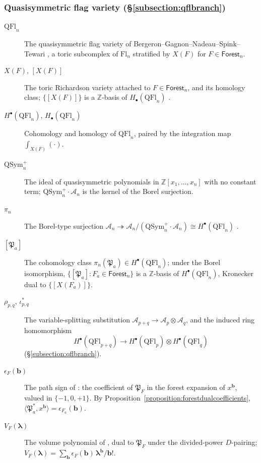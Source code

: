 \documentclass[a4paper,fleqn]{cas-sc}
\theoremstyle{definition}
\theoremstyle{remark}
\numberwithin{equation}{subsection}
\newcommand{\coma}{\mathcal{A}}
\newcommand{\forest}{\mathfrak{P}}
\begin{document}
\subsubsection*{Quasisymmetric flag variety (\S\ref{subsection:qflbranch})}
\begin{description}
\item[$\mathrm{QFl}_n$] The quasisymmetric flag variety of Bergeron--Gagnon--Nadeau--Spink--Tewari \cite{bergeron2025qsymflag}, a toric subcomplex of $\mathrm{Fl}_n$ stratified by $X(F)$ for $F\in\mathsf{Forest}_n$.
\item[{$X(F)$, $[X(F)]$}] The toric Richardson variety attached to $F\in\mathsf{Forest}_n$, and its homology class; $\{[X(F)]\}$ is a $\mathbb{Z}$-basis of $H_\bullet(\mathrm{QFl}_n)$ \cite[Cor.~11.6]{bergeron2025qsymflag}.
\item[$H^\bullet(\mathrm{QFl}_n)$, $H_\bullet(\mathrm{QFl}_n)$] Cohomology and homology of $\mathrm{QFl}_n$, paired by the integration map $\int_{X(F)}(\cdot)$.
\item[$\mathrm{QSym}_n^+$] The ideal of quasisymmetric polynomials in $\mathbb{Z}[x_1,\ldots,x_n]$ with no constant term; $\mathrm{QSym}_n^+\!\cdot\coma_n$ is the kernel of the Borel surjection.
\item[$\pi_n$] The Borel-type surjection $\coma_n\twoheadrightarrow\coma_n/(\mathrm{QSym}_n^+\!\cdot\coma_n)\cong H^\bullet(\mathrm{QFl}_n)$ \cite[Thm.~A and Cor.~12.5]{bergeron2025qsymflag}.
\item[{$[\forest_a]$}] The cohomology class $\pi_n(\forest_a)\in H^\bullet(\mathrm{QFl}_n)$; under the Borel isomorphism, $\{[\forest_a]:F_a\in\mathsf{Forest}_n\}$ is a $\mathbb{Z}$-basis of $H^\bullet(\mathrm{QFl}_n)$, Kronecker dual to $\{[X(F_a)]\}$.
\item[$\rho_{p,q}$, $\iota_{p,q}^*$] The variable-splitting substitution $\coma_{p+q}\to\coma_p\otimes\coma_q$, and the induced ring homomorphism
$$H^\bullet(\mathrm{QFl}_{p+q})\to H^\bullet(\mathrm{QFl}_p)\otimes H^\bullet(\mathrm{QFl}_q)$$
(\S\ref{subsection:qflbranch}).
\item[$\epsilon_F(\mathbf{b})$] The path sign of \cite[Prop.~10.15]{nadeau2024quasisymmetric}: the coefficient of $\forest_F$ in the forest expansion of $x^{\mathbf{b}}$, valued in $\{-1,0,+1\}$. By Proposition~\ref{proposition:forestdualcoefficients}, $\langle\forest_a^*,x^{\mathbf{b}}\rangle=\epsilon_{F_a}(\mathbf{b})$.
\item[$V_F(\boldsymbol\lambda)$] The volume polynomial of \cite[\S 10.5]{nadeau2024quasisymmetric}, dual to $\forest_F$ under the divided-power $D$-pairing; $V_F(\boldsymbol\lambda)=\sum_{\mathbf{b}}\epsilon_F(\mathbf{b})\,\boldsymbol\lambda^{\mathbf{b}}/\mathbf{b}!$.
\end{description}
\endgroup
\end{document}
